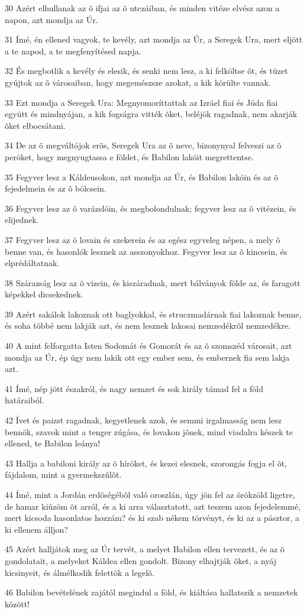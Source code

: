 \par 30 Azért elhullanak az õ ifjai az õ utczáiban, és minden vitéze elvész azon a napon, azt mondja az Úr.
\par 31 Ímé, én ellened vagyok, te kevély, azt mondja az Úr, a Seregek Ura, mert eljött a te napod, a te megfenyítésed napja.
\par 32 És megbotlik a kevély és elesik, és senki nem lesz, a ki felköltse õt, és tüzet gyújtok az õ városaiban, hogy megemészsze azokat, a kik körülte vannak.
\par 33 Ezt mondja a Seregek Ura: Megnyomoríttattak az Izráel fiai és Júda fiai együtt és mindnyájan, a kik fogságra vitték õket, beléjök ragadnak, nem akarják õket elbocsátani.
\par 34 De az õ megváltójok erõs, Seregek Ura az õ neve, bizonynyal felveszi az õ peröket, hogy megnyugtassa e földet, és Babilon lakóit megrettentse.
\par 35 Fegyver lesz a Káldeusokon, azt mondja az Úr, és Babilon lakóin és az õ fejedelmein és az õ bölcsein.
\par 36 Fegyver lesz az õ varázslóin, és megbolondulnak; fegyver lesz az õ vitézein, és elijednek.
\par 37 Fegyver lesz az õ lovain és szekerein és az egész egyveleg népen, a mely õ benne van, és hasonlók lesznek az asszonyokhoz. Fegyver lesz az õ kincsein, és elprédáltatnak.
\par 38 Szárazság lesz az õ vizein, és kiszáradnak, mert bálványok földe az, és faragott képekkel dicsekednek.
\par 39 Azért sakálok lakoznak ott baglyokkal, és struczmadárnak fiai lakoznak benne, és soha többé nem lakják azt, és nem lesznek lakosai nemzedékrõl nemzedékre.
\par 40 A mint felforgatta Isten Sodomát és Gomorát és az õ szomszéd városait, azt mondja az Úr, ép úgy nem lakik ott egy ember sem, és embernek fia sem lakja azt.
\par 41 Ímé, nép jött északról, és nagy nemzet és sok király támad fel a föld határaiból.
\par 42 Ívet és paizst ragadnak, kegyetlenek azok, és semmi irgalmasság nem lesz bennök, szavok mint a tenger zúgása, és lovakon jõnek, mind viadalra készek te ellened, te Babilon leánya!
\par 43 Hallja a babiloni király az õ híröket, és kezei elesnek, szorongás fogja el õt, fájdalom, mint a gyermekszûlõt.
\par 44 Ímé, mint a Jordán erdõségébõl való oroszlán, úgy jön fel az örökzöld ligetre, de hamar kiûzöm õt arról, és a ki arra választatott, azt teszem azon fejedelemmé, mert kicsoda hasonlatos hozzám? és ki szab nékem törvényt, és ki az a pásztor, a ki ellenem álljon?
\par 45 Azért halljátok meg az Úr tervét, a melyet Babilon ellen tervezett, és az õ gondolatait, a melyeket Káldea ellen gondolt. Bizony elhajtják õket, a nyáj kicsinyeit, és álmélkodik felettök a legelõ.
\par 46 Babilon bevételének zajától megindul a föld, és kiáltása hallatszik a nemzetek között!

